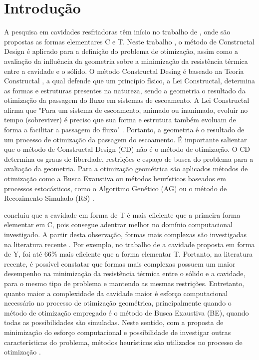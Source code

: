 \documentclass[12pt,A4,A4pt]{article}
\begin{document}

\newpage
 \onehalfspacing
\section{Introdução}

 {\fontsize{12pt}{\baselineskip}\selectfont}
 
\hspace{0.5cm}A pesquisa em cavidades resfriadoras têm início no trabalho de , onde são propostas as formas elementares C e T. Neste trabalho \cite{Biserni2004}, o método de Constructal Design é aplicado para a definição do problema de otimização, assim como a avaliação da influência da geometria sobre a minimização da resistência térmica entre a cavidade e o sólido. O método Constructal Desing é baseado na Teoria Constructal \cite{Bejan}, a qual defende que um princípio físico, a Lei Constructal, determina as formas e estruturas presentes na natureza, sendo a geometria o resultado da otimização da passagem do fluxo em sistemas de escoamento. A Lei Constructal afirma que "Para um sistema de escoamento, animado ou inanimado, evoluir no tempo (sobreviver) é preciso que sua forma e estrutura também evoluam de forma a facilitar a passagem do fluxo"        \cite{Bejan}. Portanto, a geometria é o resultado de um processo de otimização da passagem do escoamento. É importante salientar que o método de Constructal Design (CD) não é o método de otimização. O CD determina os graus de liberdade, restrições e espaço de busca do problema para a avaliação da geometria. Para a otimização geométrica são aplicados métodos de otimização como a Busca Exaustiva ou métodos heurísticos baseados em processos estocásticos, como o Algoritmo Genético (AG) ou o método de Recozimento Simulado (RS) \cite{Lorenzini2014,Gonzales2015energy}.

 concluiu que a cavidade em forma de T é mais eficiente que a primeira forma elementar em C, pois consegue adentrar melhor no domínio computacional investigado. A partir desta observação, formas mais complexas são investigadas na literatura recente \cite{Biserni2007,Lorenzini2011,Lorenzini2014,Biserni2017,Xie2010}. Por exemplo, no trabalho de  a cavidade proposta em forma de Y, foi até 66\% mais eficiente que a forma elementar T. Portanto, na literatura recente, é possível constatar que formas mais complexas possuem um maior desempenho na minimização da resistência térmica entre o sólido e a cavidade, para o mesmo tipo de problema e mantendo as mesmas restrições. Entretanto, quanto maior a complexidade da cavidade maior é esforço computacional necessário no processo de otimização geométrica, principalmente quando o método de otimização empregado é o método de Busca Exaustiva (BE), quando todas as possibilidades são simuladas. Neste sentido, com a proposta de minimização do esforço computacional e possibilidade de investigar outras características do problema, métodos heurísticos são utilizados no processo de otimização \cite{Lorenzini2014,Gonzales2015energy,Gonzales2017,Biserni2017}.
\end{document}
